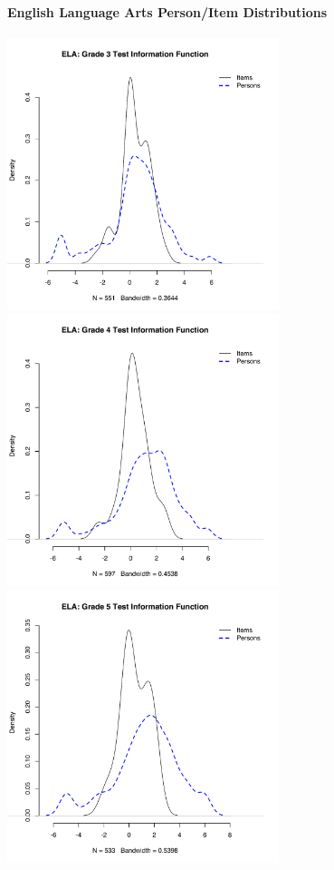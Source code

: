 \documentclass[]{article}
\let\oldparagraph\paragraph
\renewcommand{\paragraph}[1]{\oldparagraph{#1}\mbox{}}
\begin{document}
\paragraph{English Language Arts Person/Item
Distributions}\label{english-language-arts-personitem-distributions}

\FloatBarrier
\includegraphics[height=3.12500in]{ipdens/ela3ipdens.pdf}
\includegraphics[height=3.12500in]{ipdens/ela4ipdens.pdf}
\includegraphics[height=3.12500in]{ipdens/ela5ipdens.pdf}
\end{document}
